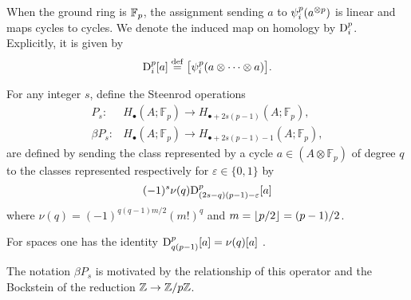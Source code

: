 When the ground ring is ${\mathbb{F}_p}$, the assignment sending $a$ to $\psi_i^p(a^{\otimes p})$ is linear and maps cycles to cycles.
We denote the induced map on homology by $\mathrm{D}_i^p$.
Explicitly, it is given by
\[
\mathrm{D}_i^p[a] \stackrel{\mathrm{def}}{=} \big[\psi_i^p(a \otimes\dotsb\otimes a)\big].
\]

\sssec

For any integer $s$, define the Steenrod operations
\begin{align*}
	P_s \colon& H_\bullet(A; \mathbb{F}_p) \to H_{\bullet + 2s(p-1)}(A; \mathbb{F}_p), \\
	\beta P_s \colon& H_\bullet(A; \mathbb{F}_p) \to H_{\bullet + 2s(p-1) - 1}(A; \mathbb{F}_p),
\end{align*}
are defined by sending the class represented by a cycle $a \in (A \otimes \mathbb{F}_p)$ of degree $q$ to the classes represented respectively for $\varepsilon \in\{0,1\}$ by
\begin{equation*}
	(-1)^s \nu(q) \mathrm{D}^p_{(2s-q)(p-1)-\varepsilon}[a]
\end{equation*}
where $\nu(q) = (-1)^{q(q-1)m/2}(m!)^q$ and $m = \lfloor p/2\rfloor = (p-1)/2$.


\begin{remark*}
	For spaces one has the identity $\mathrm{D}_{q(p-1)}^p[a] = \nu(q)[a]$ \cite[(6.1)]{steenrod1953cyclic}.
\end{remark*}

\begin{remark*}
	The notation $\beta P_s$ is motivated by the relationship of this operator and the Bockstein of the reduction $\mathbb{Z} \to \mathbb{Z}/p\mathbb{Z}$.
\end{remark*}
